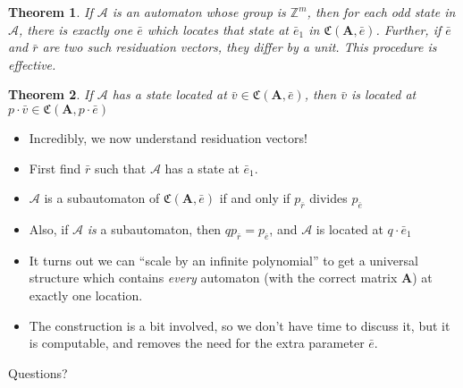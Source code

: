 \documentclass{beamer}
\newtheorem{thm}{Theorem}
\newcommand{\2}{\textbf{2}}
\newcommand{\A}{\mathcal{A}}
\newcommand{\Z}{\mathbb{Z}}
\newcommand{\Am}{\textbf{A}}
\newcommand{\e}{\bar{e}}
\renewcommand{\r}{\bar{r}}
\renewcommand{\v}{\bar{v}}
\newcommand{\C}{\mathfrak{C}(\Am,\e)}
\begin{document}
\begin{frame}
  \begin{thm}
    If $\A$ is an automaton whose group is $\Z^m$, then for each odd state
    in $\A$, there is exactly one $\e$ which locates that state at $\e_1$
    in $\C$. Further, if $\e$ and $\r$ are two such residuation vectors,
    they differ by a unit. This procedure is effective.
  \end{thm}

  \begin{thm}
    If $\A$ has a state located at $\v \in \C$, then $\v$ is located
    at $p \cdot \v \in \mathfrak{C}(\Am, p \cdot \e)$
  \end{thm}

  \begin{itemize}
    \item Incredibly, we now understand residuation vectors!
    \pause
    \item First find $\r$ such that $\A$ has a state at $\e_1$.
    \item $\A$ is a subautomaton of $\C$ if and only if $p_{\r}$
      divides $p_{\e}$
    \item Also, if $\A$ \emph{is} a subautomaton, then 
      $q p_{\r} = p_{\e}$, and $\A$ is located at $q \cdot \e_1$
  \end{itemize}
\end{frame}

\begin{frame}
  \begin{itemize}
    \item It turns out we can ``scale by an infinite polynomial'' to
      get a universal structure which contains \emph{every} automaton
      (with the correct matrix $\Am$) at exactly one location.
    \item The construction is a bit involved, so we don't have time to
      discuss it, but it is computable, and removes the need for the
      extra parameter $\e$.
  \end{itemize}
\end{frame}

\begin{frame}{Questions?}
\end{frame}
\end{document}
